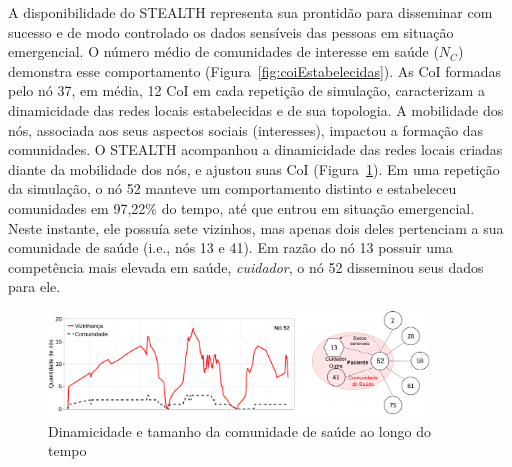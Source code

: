 \documentclass[12pt]{article}
\newcommand{\agn}[1]{\textcolor{auburn}{#1}}
\begin{document}
A disponibilidade do \mbox{STEALTH} representa sua prontidão para disseminar com sucesso e de modo controlado os dados sensíveis das pessoas em situação emergencial. O número médio de comunidades de interesse em saúde ($N_{C}$) demonstra esse comportamento (Figura~\ref{fig:coiEstabelecidas}).
\agn{As CoI formadas pelo}
nó 37,
em média, 12 CoI em cada repetição de simulação,
\agn{caracterizam}
a dinamicidade das redes locais estabelecidas e de sua topologia. A mobilidade dos nós, associada aos seus aspectos sociais (interesses), impactou a formação das comunidades.
%
%
O \mbox{STEALTH} acompanhou a dinamicidade das redes locais criadas diante da mobilidade dos nós,
\agn{e ajustou}
suas CoI \agn{(Figura~\ref{fig:neighs_x_cois}).}
\agn{Em uma repetição da simulação, o}
nó 52
manteve um comportamento distinto e estabeleceu comunidades em 97,22\% do tempo, até que entrou em situação emergencial. Neste instante,
ele possuía sete vizinhos, mas apenas dois deles pertenciam a sua comunidade de saúde (i.e., nós 13 e 41). Em razão do nó 13 possuir  uma competência mais elevada em saúde, \textit{cuidador}, o nó 52 disseminou seus dados para ele.

\begin{figure}[!htb]
\centering
\includegraphics[width=0.9\textwidth]{figures/neighs_cois_v2_890s_stack_1node.pdf}
\vspace{-0.2cm}
\caption{Dinamicidade e tamanho da comunidade de saúde ao longo do tempo}
\label{fig:neighs_x_cois}
\end{figure}
\end{document}
